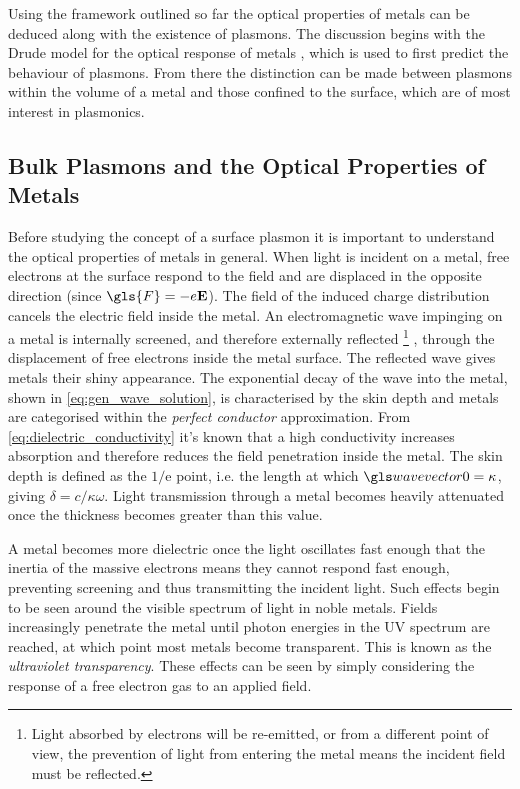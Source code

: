 \documentclass{article}
\begin{document}
Using the framework outlined so far the optical properties of metals can be deduced along with the existence of plasmons. The discussion begins with the Drude model for the optical response of metals \cite{drude1900}, which is used to first predict the behaviour of plasmons. From there the distinction can be made between plasmons within the volume of a metal and those confined to the surface, which are of most interest in plasmonics.

\subsection{Bulk Plasmons and the Optical Properties of Metals}

Before studying the concept of a surface plasmon it is important to understand the optical properties of metals in general. When light is incident on a metal, free electrons at the surface respond to the field and are displaced in the opposite direction (since $\gls{F}=-e\vec{E}$). The field of the induced charge distribution cancels the electric field inside the metal. An electromagnetic wave impinging on a metal is internally screened{\color{red}, and therefore externally reflected%
\footnote{Light absorbed by electrons will be re-emitted, or from a different point of view, the prevention of light from entering the metal means the incident field must be reflected.}
,} through the displacement of free electrons inside the metal surface. The reflected wave gives metals their shiny appearance.
The exponential decay of the wave into the metal, shown in \eqref{eq:gen_wave_solution}, is characterised by the skin depth and metals are categorised within the \textit{perfect conductor} approximation.
From \eqref{eq:dielectric_conductivity} it's known that a high conductivity increases absorption and therefore reduces the field penetration inside the metal. The skin depth is defined as the $1/\mathrm{e}$ point, i.e. the length at which $\wvz=\kappa$, giving $\delta=c/\kappa\omega$. Light transmission through a metal becomes heavily attenuated once the thickness becomes greater than this value.

A metal becomes more dielectric once the light oscillates fast enough that the inertia of the {\color{red}massive} electrons means they cannot respond fast enough, preventing screening and thus transmitting the incident light. Such effects begin to be seen around the visible spectrum of light in noble metals. Fields increasingly penetrate the metal until photon energies in the UV spectrum are reached, at which point most metals become transparent. This is known as the \textit{ultraviolet transparency}. These effects can be seen by simply considering the response of a free electron gas to an applied field.
\end{document}
